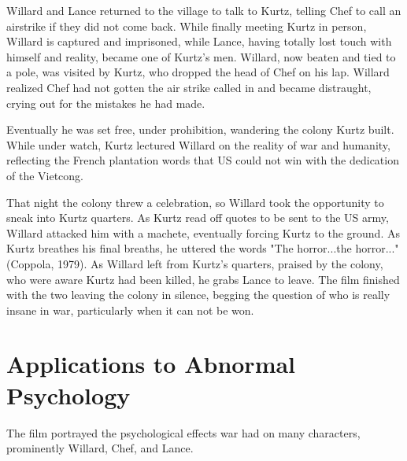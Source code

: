 \documentclass[a4paper,man,natbib]{apa6}
\begin{document}
Willard and Lance returned to the village to talk to Kurtz, telling Chef to call an airstrike if they did not come back. While finally meeting Kurtz in person, Willard is captured and imprisoned, while Lance, having totally lost touch with himself and reality, became one of Kurtz's men. Willard, now beaten and tied to a pole, was visited by Kurtz, who dropped the head of Chef on his lap. Willard realized Chef had not gotten the air strike called in and became distraught, crying out for the mistakes he had made.

Eventually he was set free, under prohibition, wandering the colony Kurtz built. While under watch, Kurtz lectured Willard on the reality of war and humanity, reflecting the French plantation words that US could not win with the dedication of the Vietcong.

That night the colony threw a celebration, so Willard took the opportunity to sneak into Kurtz quarters. As Kurtz read off quotes to be sent to the US army, Willard attacked him with a machete, eventually forcing Kurtz to the ground. As Kurtz breathes his final breaths, he uttered the words "The horror...the horror..." (Coppola, 1979). As Willard left from Kurtz's quarters, praised by the colony, who were aware Kurtz had been killed, he grabs Lance to leave. The film finished with the two leaving the colony  in silence, begging the question of who is really insane in war, particularly when it can not be won.

\section{Applications to Abnormal Psychology}

The film portrayed the psychological effects war had on many characters, prominently Willard, Chef, and Lance.
\end{document}
